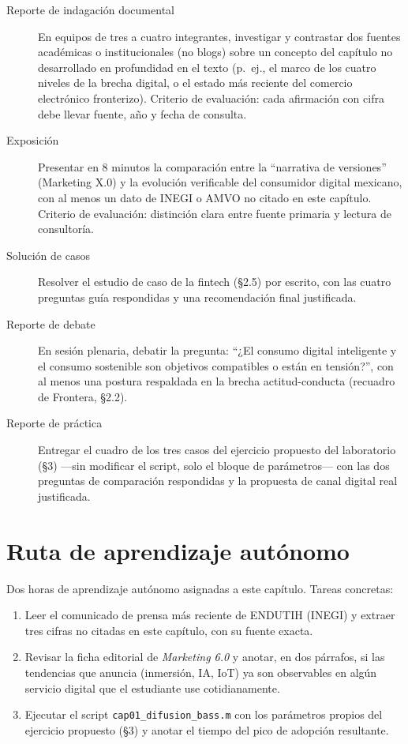\begin{description}
  \item[Reporte de indagación documental] En equipos de tres a cuatro
  integrantes, investigar y contrastar dos fuentes académicas o
  institucionales (no blogs) sobre un concepto del capítulo no desarrollado
  en profundidad en el texto (p.\ ej., el marco de los cuatro niveles de la
  brecha digital, o el estado más reciente del comercio electrónico
  fronterizo). Criterio de evaluación: cada afirmación con cifra debe llevar
  fuente, año y fecha de consulta.
  \item[Exposición] Presentar en 8 minutos la comparación entre la
  \enquote{narrativa de versiones} (Marketing X.0) y la evolución verificable del
  consumidor digital mexicano, con al menos un dato de INEGI o AMVO no citado
  en este capítulo. Criterio de evaluación: distinción clara entre fuente
  primaria y lectura de consultoría.
  \item[Solución de casos] Resolver el estudio de caso de la fintech
  (\S 2.5) por escrito, con las cuatro preguntas guía respondidas y una
  recomendación final justificada.
  \item[Reporte de debate] En sesión plenaria, debatir la pregunta: \enquote{¿El
  consumo digital inteligente y el consumo sostenible son objetivos
  compatibles o están en tensión?}, con al menos una postura respaldada en la
  brecha actitud-conducta (recuadro de Frontera, \S 2.2).
  \item[Reporte de práctica] Entregar el cuadro de los tres casos del
  ejercicio propuesto del laboratorio (\S 3) —sin modificar el script, solo
  el bloque de parámetros— con las dos preguntas de comparación respondidas
  y la propuesta de canal digital real justificada.
\end{description}

\section{Ruta de aprendizaje autónomo}

Dos horas de aprendizaje autónomo asignadas a este capítulo. Tareas
concretas:
\begin{enumerate}
  \item Leer el comunicado de prensa más reciente de ENDUTIH (INEGI) y
  extraer tres cifras no citadas en este capítulo, con su fuente exacta.
  \item Revisar la ficha editorial de \textit{Marketing 6.0}
  \parencite{kotler2024marketing6} y anotar, en dos párrafos, si las
  tendencias que anuncia (inmersión, IA, IoT) ya son observables en algún
  servicio digital que el estudiante use cotidianamente.
  \item Ejecutar el script \texttt{cap01\_difusion\_bass.m} con los
  parámetros propios del ejercicio propuesto (\S 3) y anotar el tiempo del
  pico de adopción resultante.
\end{enumerate}

